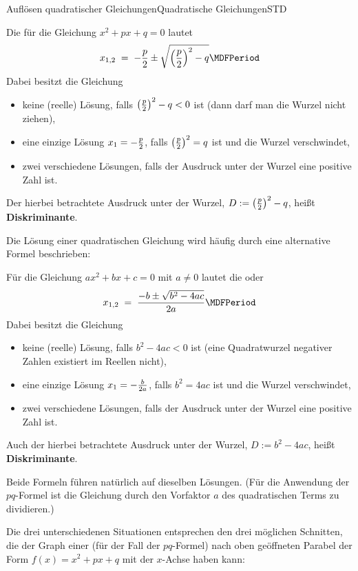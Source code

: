 \begin{MXContent}{Auflösen quadratischer Gleichungen}{Quadratische Gleichungen}{STD}
\begin{MInfo}
Die  für die Gleichung $x^2+p x + q = 0$ lautet
$$
x_{1,2} \;=\; -\Mdfrac{p}{2}\pm \sqrt{\left(\Mdfrac{p}{2}\right)^2-q} \MDFPeriod
$$
Dabei besitzt die Gleichung
\begin{itemize}
\item{keine (reelle) Lösung, falls $\left(\tfrac{p}{2}\right)^2-q<0$ ist (dann darf man die Wurzel nicht ziehen),}
\item{eine einzige Lösung $x_1=-\tfrac{p}{2}$, falls $\left(\tfrac{p}{2}\right)^2=q$ ist und die Wurzel verschwindet,}
\item{zwei verschiedene Lösungen, falls der Ausdruck unter der Wurzel eine positive Zahl ist.} %
\end{itemize}
Der hierbei betrachtete Ausdruck unter der Wurzel, $D:=\left(\tfrac{p}{2}\right)^2-q$, heißt
\textbf{Diskriminante}.
\end{MInfo}
Die Lösung einer quadratischen Gleichung wird häufig durch eine 
alternative Formel beschrieben:
\begin{MInfo}
Für die Gleichung $a x^2+b x + c = 0$ mit $a\ne 0$ lautet die
 oder
$$
x_{1,2} \;=\; \frac{-b\pm\sqrt{b^2-4 a c}}{2a} \MDFPeriod
$$
Dabei besitzt die Gleichung
\begin{itemize}
\item{keine (reelle) Lösung, falls $b^2-4 a c<0$ ist (eine Quadratwurzel negativer Zahlen existiert im Reellen nicht),}
\item{eine einzige Lösung $x_1=-\tfrac{b}{2a}$, falls $b^2=4 a c$ ist und die Wurzel verschwindet,}
\item{zwei verschiedene Lösungen, falls der Ausdruck unter der Wurzel eine positive Zahl ist.} %
\end{itemize}
Auch der hierbei betrachtete Ausdruck unter der Wurzel, $D:=b^2-4 a c$, heißt
\textbf{Diskriminante}.
\end{MInfo}
Beide Formeln führen natürlich auf dieselben Lösungen. (Für die Anwendung der
$p q$-Formel ist die Gleichung durch den Vorfaktor $a$ des quadratischen
Terms zu dividieren.)
\medskip\par
Die drei unterschiedenen Situationen entsprechen den drei möglichen Schnitten, die der Graph einer (für der Fall der $p q$-Formel) nach oben geöffneten Parabel der Form $f(x)=x^2+p x+ q$
mit der $x$-Achse haben kann:


\end{MXContent}
